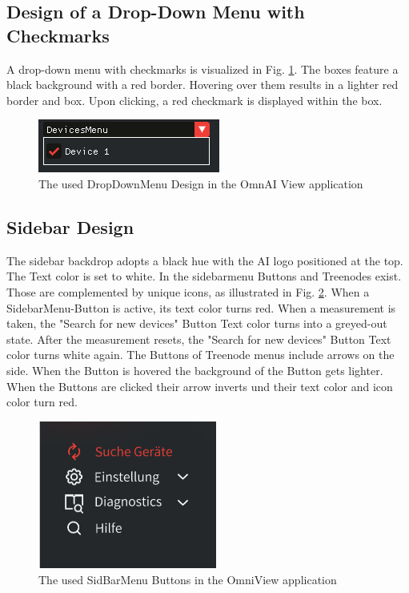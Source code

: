 \documentclass[]{scrreprt}
\begin{document}
\subsection{Design of a Drop-Down Menu with Checkmarks}

A drop-down menu with checkmarks is visualized in Fig. \ref{fig: DragandDropwithCheckmarks}. The boxes feature a black background with a red border. Hovering over them results in a lighter red border and box. Upon clicking, a red checkmark is displayed within the box.

\begin{figure}
    \includegraphics[width=.5\textwidth]{assets/pictures/DropDownMenu.png}
    \caption[]{The used DropDownMenu Design in the OmnAI View application}
    \label{fig: DragandDropwithCheckmarks}
\end{figure}

\subsection{Sidebar Design}

The sidebar backdrop adopts a black hue with the AI logo positioned at the top. The Text color is set to white. 
In the sidebarmenu Buttons and Treenodes exist. Those are complemented by unique icons, as illustrated in Fig. \ref{fig: SideMenuIcons}.
 When a SidebarMenu-Button is active, its text color turns red. When a measurement is taken, the "Search for new devices" Button Text color turns into a greyed-out state.
  After the measurement resets, the "Search for new devices" Button Text color turns white again. The Buttons of Treenode menus include arrows on the side. 
   When the Button is hovered the background of the Button gets lighter.
 When the Buttons are clicked their arrow inverts und their text color and icon color turn red. 

\begin{figure}
    \includegraphics[width=.4\textwidth]{assets/pictures/SideBarMenuButtons.png}
    \caption[]{The used SidBarMenu Buttons in the OmniView application}
    \label{fig: SideMenuIcons}
\end{figure}
\end{document}
